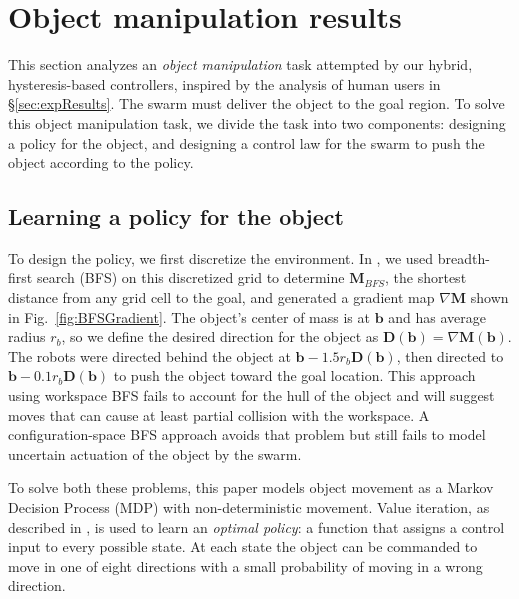 
\section{Object manipulation results}\label{sec:exp}

This section analyzes an \emph{object manipulation} task attempted by our hybrid, hysteresis-based controllers, inspired by the analysis of human users in \S \ref{sec:expResults}.  
The swarm must deliver the object to the goal region.  To solve this object manipulation task, we divide the task into two components: designing a policy for the object, and designing a control law for the swarm to push the object according to the policy.

\subsection{Learning a policy for the object}\label{subsec:objectpolicy}

To design the policy, we first discretize the environment. 
In \cite{ShahrokhiIROS2015}, we used breadth-first search (BFS) on this discretized grid to determine $\mathbf{M}_{BFS}$, the shortest distance from any grid cell to the goal, and generated a gradient map $\nabla \mathbf{M}$  shown in Fig.~\ref{fig:BFSGradient}.  
The object's center of mass is at $\mathbf{b}$ and has average radius $r_b$, so we define the desired direction for the object as $\mathbf{D}(\mathbf{b}) = \nabla \mathbf{M}(\mathbf{b})$. 
The robots were directed behind the object at  $\mathbf{b} - 1.5 r_b \mathbf{D}(\mathbf{b})$, then directed to  $\mathbf{b} - 0.1 r_b \mathbf{D}(\mathbf{b})$ to push the object toward the goal location. 
This approach using workspace BFS fails to account for the hull of the object and will suggest moves that can cause at least partial collision with the workspace. A configuration-space BFS approach avoids that problem but still fails to model uncertain actuation of the object by the swarm.

To solve both these problems, this paper models object movement as a Markov Decision Process (MDP) with non-deterministic movement.  
  Value iteration,  as described in \cite{Thrun2005}, is used to learn an \emph{optimal policy}: a function that assigns a control input to every possible state.
 At each state the object can be commanded to move in one of eight directions with a small probability of moving in a wrong direction. 
 
